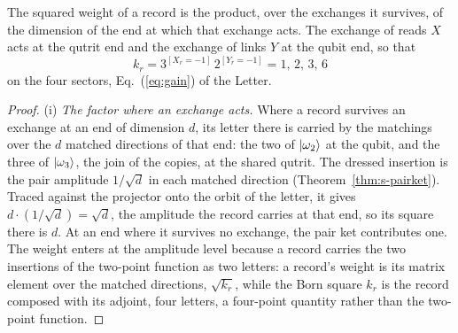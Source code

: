 \begin{theorem}
\label{thm:s-gain}
The squared weight of a record is the product, over the exchanges it survives, of the dimension of the end at which that exchange acts. The exchange of reads $X$ acts at the qutrit end and the exchange of links $Y$ at the qubit end, so that
\begin{equation}
k_{r}=3^{[X_{r}=-1]}\,2^{[Y_{r}=-1]}=1,\,2,\,3,\,6
\end{equation}
on the four sectors, Eq.~(\ref{eq:gain}) of the Letter.
\end{theorem}
\begin{proof}
(i) \emph{The factor where an exchange acts.} Where a record survives an exchange at an end of dimension $d$, its letter there is carried by the matchings over the $d$ matched directions of that end: the two of $|\omega_{2}\rangle$ at the qubit, and the three of $|\omega_{3}\rangle$, the join of the copies, at the shared qutrit. The dressed insertion is the pair amplitude $1/\sqrt{d}$ in each matched direction (Theorem~\ref{thm:s-pairket}). Traced against the projector onto the orbit of the letter, it gives $d\cdot(1/\sqrt{d})=\sqrt{d}$, the amplitude the record carries at that end, so its square there is $d$. At an end where it survives no exchange, the pair ket contributes one. The weight enters at the amplitude level because a record carries the two insertions of the two-point function as two letters: a record's weight is its matrix element over the matched directions, $\sqrt{k_{r}}$, while the Born square $k_{r}$ is the record composed with its adjoint, four letters, a four-point quantity rather than the two-point function.


\end{proof}
